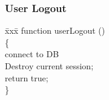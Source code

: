 \documentclass[11pt]{report}
\begin{document}
\begin{figure}[h]
\subsubsection{User Logout}
\begin{tabbing}
\= xxx\= \kill
function userLogout ()\\
\{\\
\hspace{0.3in}connect to DB\\
\hspace{0.3in}Destroy current session;\\
\hspace{0.3in}return true;\\
\}
\end{tabbing}
\end{figure}
\end{document}
